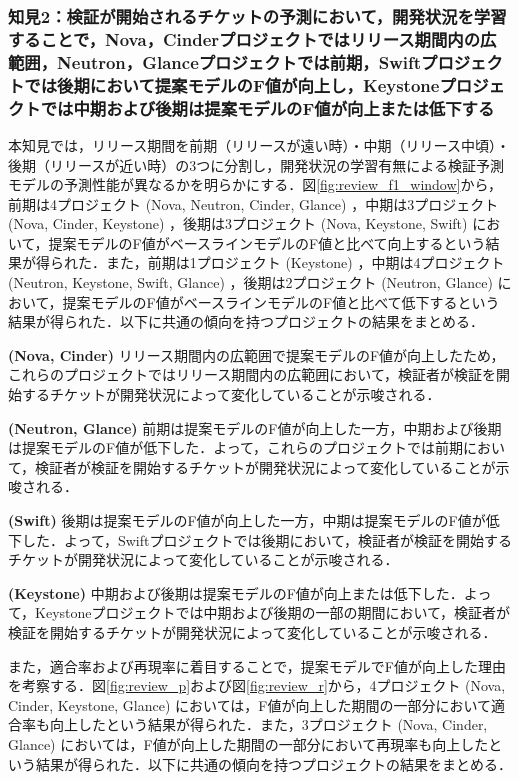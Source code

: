 \documentclass[11pt]{jreport}
\begin{document}
\subsubsection{知見2：検証が開始されるチケットの予測において，開発状況を学習することで，Nova，Cinderプロジェクトではリリース期間内の広範囲，Neutron，Glanceプロジェクトでは前期，Swiftプロジェクトでは後期において提案モデルのF値が向上し，Keystoneプロジェクトでは中期および後期は提案モデルのF値が向上または低下する}
本知見では，リリース期間を前期（リリースが遠い時）・中期（リリース中頃）・後期（リリースが近い時）の3つに分割し，開発状況の学習有無による検証予測モデルの予測性能が異なるかを明らかにする．図\ref{fig:review_f1_window}から，前期は4プロジェクト (Nova, Neutron, Cinder, Glance) ，中期は3プロジェクト (Nova, Cinder, Keystone) ，後期は3プロジェクト (Nova, Keystone, Swift) において，提案モデルのF値がベースラインモデルのF値と比べて向上するという結果が得られた．また，前期は1プロジェクト (Keystone) ，中期は4プロジェクト (Neutron, Keystone, Swift, Glance) ，後期は2プロジェクト (Neutron, Glance) において，提案モデルのF値がベースラインモデルのF値と比べて低下するという結果が得られた．以下に共通の傾向を持つプロジェクトの結果をまとめる．

\textbf{ (Nova, Cinder) }リリース期間内の広範囲で提案モデルのF値が向上したため，これらのプロジェクトではリリース期間内の広範囲において，検証者が検証を開始するチケットが開発状況によって変化していることが示唆される．

\textbf{ (Neutron, Glance) }前期は提案モデルのF値が向上した一方，中期および後期は提案モデルのF値が低下した．よって，これらのプロジェクトでは前期において，検証者が検証を開始するチケットが開発状況によって変化していることが示唆される．

\textbf{ (Swift) }後期は提案モデルのF値が向上した一方，中期は提案モデルのF値が低下した．よって，Swiftプロジェクトでは後期において，検証者が検証を開始するチケットが開発状況によって変化していることが示唆される．

\textbf{ (Keystone) }中期および後期は提案モデルのF値が向上または低下した．よって，Keystoneプロジェクトでは中期および後期の一部の期間において，検証者が検証を開始するチケットが開発状況によって変化していることが示唆される．

また，適合率および再現率に着目することで，提案モデルでF値が向上した理由を考察する．図\ref{fig:review_p}および図\ref{fig:review_r}から，4プロジェクト (Nova, Cinder, Keystone, Glance) においては，F値が向上した期間の一部分において適合率も向上したという結果が得られた．また，3プロジェクト (Nova, Cinder, Glance) においては，F値が向上した期間の一部分において再現率も向上したという結果が得られた．以下に共通の傾向を持つプロジェクトの結果をまとめる．
\end{document}
